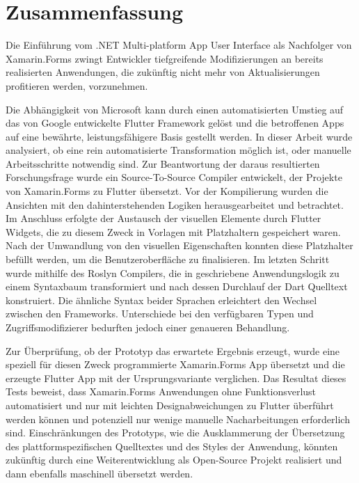 
\chapter*{Zusammenfassung}
Die Einführung vom .NET Multi-platform App User Interface als Nachfolger von Xamarin.Forms zwingt Entwickler tiefgreifende Modifizierungen an bereits realisierten Anwendungen, die zukünftig nicht mehr von Aktualisierungen profitieren werden, vorzunehmen.

Die Abhängigkeit von Microsoft kann durch einen automatisierten Umstieg auf das von Google entwickelte Flutter Framework gelöst und die betroffenen Apps auf eine bewährte, leistungsfähigere Basis gestellt werden. In dieser Arbeit wurde analysiert, ob eine rein automatisierte Transformation möglich ist, oder manuelle Arbeitsschritte notwendig sind.  Zur Beantwortung der daraus resultierten Forschungsfrage wurde ein Source-To-Source Compiler entwickelt, der Projekte von Xamarin.Forms zu Flutter übersetzt. Vor der  Kompilierung wurden die Ansichten mit den dahinterstehenden Logiken herausgearbeitet und betrachtet.  Im Anschluss erfolgte der Austausch der visuellen Elemente durch Flutter Widgets, die zu diesem Zweck in Vorlagen mit Platzhaltern gespeichert waren. Nach der Umwandlung von den visuellen Eigenschaften konnten diese Platzhalter befüllt werden, um die Benutzeroberfläche zu finalisieren.  Im letzten Schritt wurde mithilfe des Roslyn Compilers, die in \Csharp{} geschriebene Anwendungslogik zu einem Syntaxbaum transformiert und nach dessen Durchlauf der Dart Quelltext konstruiert. Die ähnliche Syntax beider Sprachen erleichtert den Wechsel zwischen den Frameworks.  Unterschiede bei den verfügbaren Typen und Zugriffsmodifizierer bedurften jedoch einer genaueren Behandlung.

Zur Überprüfung,  ob der Prototyp das erwartete Ergebnis erzeugt, wurde eine speziell für diesen Zweck programmierte Xamarin.Forms App übersetzt und die erzeugte Flutter App mit der Ursprungsvariante verglichen. Das Resultat dieses Tests beweist, dass Xamarin.Forms Anwendungen ohne Funktionsverlust automatisiert und nur mit leichten Designabweichungen zu Flutter überführt werden können und potenziell nur wenige manuelle Nacharbeitungen erforderlich sind.  Einschränkungen des Prototyps, wie die Ausklammerung der Übersetzung des plattformspezifischen Quelltextes und des Styles der Anwendung, könnten zukünftig durch eine Weiterentwicklung als Open-Source Projekt realisiert und dann ebenfalls maschinell übersetzt werden.


